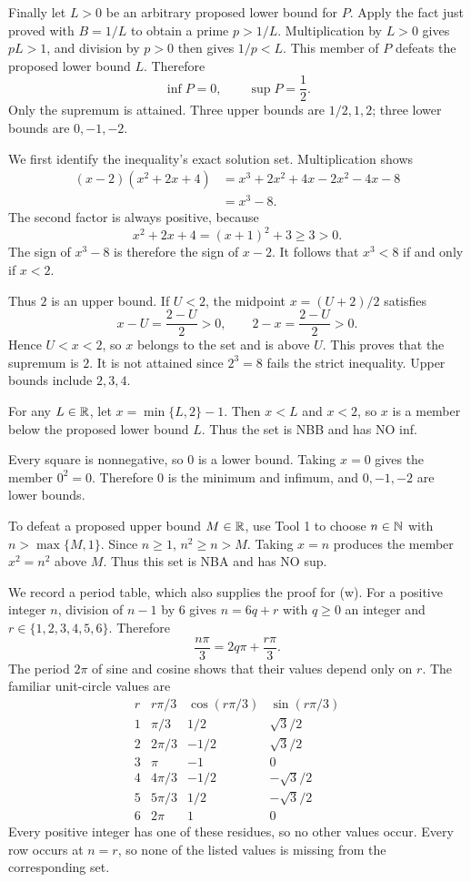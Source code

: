 Finally let $L>0$ be an arbitrary proposed lower bound for $P$.
Apply the fact just proved with $B=1/L$ to obtain a prime $p>1/L$.
Multiplication by $L>0$ gives $pL>1$, and division by $p>0$
then gives $1/p<L$. This member of $P$ defeats the proposed
lower bound $L$. Therefore
\[
 \inf P=0,\qquad \sup P=\frac12.
\]
Only the supremum is attained. Three upper bounds are $1/2,1,2$;
three lower bounds are $0,-1,-2$.

\label{bounds:t}
We first identify the inequality's exact solution set. Multiplication
shows
\begin{align*}
 (x-2)(x^2+2x+4)
 &=x^3+2x^2+4x-2x^2-4x-8\\
 &=x^3-8.
\end{align*}
The second factor is always positive, because
\[
 x^2+2x+4=(x+1)^2+3\geq3>0.
\]
The sign of $x^3-8$ is therefore the sign of $x-2$. It follows
that $x^3<8$ if and only if $x<2$.

Thus $2$ is an upper bound. If $U<2$, the midpoint
$x=(U+2)/2$ satisfies
\[
 x-U=\frac{2-U}{2}>0,
 \qquad 2-x=\frac{2-U}{2}>0.
\]
Hence $U<x<2$, so $x$ belongs to the set and is above $U$.
This proves that the supremum is $2$. It is not attained since
$2^3=8$ fails the strict inequality. Upper bounds include $2,3,4$.

For any $L\in\mathbb{R}$, let $x=\min\{L,2\}-1$. Then $x<L$ and
$x<2$, so $x$ is a member below the proposed lower bound $L$.
Thus the set is NBB and has NO inf.

\label{bounds:u}
Every square is nonnegative, so $0$ is a lower bound. Taking
$x=0$ gives the member $0^2=0$. Therefore $0$ is the minimum
and infimum, and $0,-1,-2$ are lower bounds.

To defeat a proposed upper bound $M\in\mathbb{R}$, use Tool 1 to choose
$n\in\mathbb{N}$ with $n>\max\{M,1\}$. Since $n\geq1$,
$n^2\geq n>M$. Taking $x=n$ produces the member $x^2=n^2$
above $M$. Thus this set is NBA and has NO sup.

\label{bounds:v}
We record a period table, which also supplies the proof for (w).
For a positive integer $n$, division of $n-1$ by $6$ gives
$n=6q+r$ with $q\geq0$ an integer and $r\in\{1,2,3,4,5,6\}$.
Therefore
\[
 \frac{n\pi}{3}=2q\pi+\frac{r\pi}{3}.
\]
The period $2\pi$ of sine and cosine shows that their values depend
only on $r$. The familiar unit-circle values are
\[
\begin{array}{c|c|c|c}
 r&r\pi/3&\cos(r\pi/3)&\sin(r\pi/3)\\ \hline
 1&\pi/3&1/2&\sqrt3/2\\
 2&2\pi/3&-1/2&\sqrt3/2\\
 3&\pi&-1&0\\
 4&4\pi/3&-1/2&-\sqrt3/2\\
 5&5\pi/3&1/2&-\sqrt3/2\\
 6&2\pi&1&0
\end{array}
\]
Every positive integer has one of these residues, so no other values
occur. Every row occurs at $n=r$, so none of the listed values is
missing from the corresponding set.

